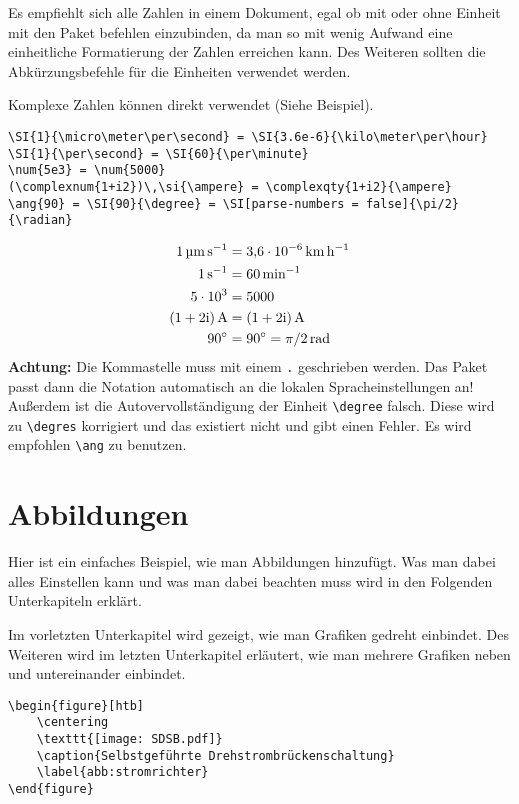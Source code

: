 Es empfiehlt sich alle Zahlen in einem Dokument, egal ob mit oder ohne Einheit mit den Paket befehlen einzubinden, da man so mit wenig Aufwand eine einheitliche Formatierung der Zahlen erreichen kann. Des Weiteren sollten die Abkürzungsbefehle für die Einheiten verwendet werden.
 
Komplexe Zahlen können direkt verwendet (Siehe Beispiel).
\begin{lstlisting}[style=latex]
\SI{1}{\micro\meter\per\second} = \SI{3.6e-6}{\kilo\meter\per\hour}
\SI{1}{\per\second} = \SI{60}{\per\minute}
\num{5e3} = \num{5000}
(\complexnum{1+i2})\,\si{\ampere} = \complexqty{1+i2}{\ampere}
\ang{90} = \SI{90}{\degree} = \SI[parse-numbers = false]{\pi/2}{\radian}
\end{lstlisting}
\begin{align}
	\SI{1}{\micro\meter\per\second} &= \SI{3.6e-6}{\kilo\meter\per\hour}\\
	\SI{1}{\per\second} &= \SI{60}{\per\minute}\\
	\num{5e3} &= \num{5000}\\
	(\complexnum{1+2i})\,\si{\ampere} &= \complexqty{1+2i}{\ampere}\\
	\ang{90} &= \SI{90}{\degree} = \SI[parse-numbers = false]{\pi /2}{\radian}
\end{align}
\textbf{Achtung:} Die Kommastelle muss mit einem \verb|.| geschrieben werden. Das Paket passt dann die Notation automatisch an die lokalen Spracheinstellungen an! Außerdem ist die Autovervollständigung der Einheit \verb|\degree| falsch. Diese wird zu \verb|\degres| korrigiert und das existiert nicht und gibt einen Fehler. Es wird empfohlen \verb|\ang| zu benutzen.

\newpage
\section{Abbildungen}
\label{sec:abbildungen}
Hier ist ein einfaches Beispiel, wie man Abbildungen hinzufügt. Was man dabei alles Einstellen kann und was man dabei beachten muss wird in den Folgenden Unterkapiteln erklärt. 

Im vorletzten Unterkapitel wird gezeigt, wie man Grafiken gedreht einbindet.
Des Weiteren wird im letzten Unterkapitel erläutert, wie man mehrere Grafiken neben und untereinander einbindet.

\begin{lstlisting}[style=latex]
\begin{figure}[htb]
	\centering
	\texttt{[image: SDSB.pdf]}
	\caption{Selbstgeführte Drehstrombrückenschaltung}
	\label{abb:stromrichter}
\end{figure}
\end{lstlisting}

